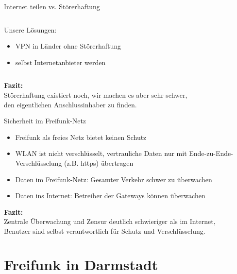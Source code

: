 \documentclass[10pt]{beamer}
\begin{document}
\begin{frame}{Internet teilen vs. Störerhaftung}
\begin{columns}[c]
\begin{column}{8cm}
	\bigskip
	\pause
	
	Unsere Lösungen:
	\begin{itemize}
		\item VPN in Länder ohne Störerhaftung
		\item selbst Internetanbieter werden
	\end{itemize}
		\end{column}
	\end{columns}
	
	\vfill
	\centering
	\pause \textbf{Fazit:}\\Störerhaftung existiert noch, wir machen es aber sehr schwer,\\den eigentlichen Anschlussinhaber zu finden.

\end{frame}

\begin{frame}{Sicherheit im Freifunk-Netz}
	\begin{itemize}[<+->]
		\item Freifunk als freies Netz bietet keinen Schutz
		\item WLAN ist nicht verschlüsselt, vertrauliche Daten nur mit Ende-zu-Ende-Verschlüsselung (z.B. https) übertragen
		\vfill
		\item Daten im Freifunk-Netz: Gesamter Verkehr schwer zu überwachen
		\pause\item Daten ins Internet: Betreiber der Gateways können überwachen
		\vfill
	\end{itemize}
	\centering
	\textbf{Fazit:}\\Zentrale Überwachung und Zensur deutlich schwieriger als im Internet, \\
	Benutzer sind selbst verantwortlich für Schutz und Verschlüsselung.
\end{frame}

\section{Freifunk in Darmstadt}
\end{document}
